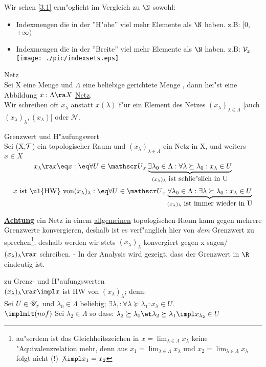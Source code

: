Wir sehen \ref{3.1} erm"oglicht im Vergleich zu $\N$ sowohl:
\begin{itemize}
\item Indexmengen die in der ''H"ohe'' viel mehr Elemente als $\N$ haben. z.B: [0,$+\infty)$
\item Indexmengen die in der ''Breite'' viel mehr Elemente als $\N$ haben. z.B: ${\mathcal V}_{x}$
\texttt{[image: ./pic/indexsets.eps]}
\end{itemize}
\begin{definition}\label{3.4}Netz\\
Sei X eine Menge und $\Lambda$ eine beliebige gerichtete Menge , dann hei"st eine Abbildung $x:\Lambda\ra X$ \ul{Netz}.\\
Wir schreiben oft $x_\lambda$ anstatt $x(\lambda )$ f"ur ein Element des Netzes $(x_\lambda )_{\lambda\in\Lambda} $ [auch $(x_\lambda )_\lambda ,(x_\lambda )]$ oder ${\mathcal N}$.
\end{definition}
\begin{definition}\label{3.5}Grenzwert und H"aufungswert\\
Sei (X,$\mathcal T$) ein topologischer Raum und $(x_\lambda )_{\lambda\in\Lambda}$ ein Netz in X, und weiters $x\in X$
$$x_\lambda\ra x \eq x :\eq\forall U\in\umg{U}{x}\underbrace{\exists\lambda_0\in\Lambda:\forall\lambda\succeq\lambda_0:x_\lambda\in U}_{(x_\lambda )_\lambda\mbox{ ist schlie"slich in U}}$$
$$x\mbox{ ist \ul{HW} von} (x_\lambda )_\lambda :\eq \forall U\in\umg{U}{x}\underbrace{\forall\lambda_0\in\Lambda :\exists \lambda\succeq\lambda_0:x_\lambda\in U}_{(x_\lambda )_\lambda\mbox{ ist immer wieder in U}}$$
\end{definition} 
{\bf\ul{Achtung}} ein Netz in einem \ul{allgemeinen} topologischen Raum kann gegen mehrere Grenzwerte konvergieren, deshalb ist es verf"anglich hier von {\it dem} Grenzwert zu sprechen\footnote{au"serdem ist das Gleichheitszeichen in $x=\lim_{\lambda\in\Lambda}x_\lambda$ keine "Aquivalenzrelation mehr, denn aus $x_1=\lim_{\lambda\in\Lambda}x_\lambda$ und $x_2=\lim_{\lambda\in\Lambda}x_\lambda$ folgt nicht (!) $\not\impl x_1=x_2$}; deshalb werden wir stets $(x_\lambda )_\lambda$ konvergiert gegen x sagen/ $(x_\lambda )_\lambda\ra x$ schreiben. - In der Analysis wird gezeigt, dass der Grenzwert in $\R$ eindeutig ist.

\begin{beob}\label{3.6}zu Grenz- und H"aufungswerten\\
$(x_\lambda )_\lambda\ra x\impl x$ ist HW von $(x_\lambda )_\lambda$; denn:\\
Sei $U\in{\mathscr U}_{x}$ und $\lambda_0\in\Lambda$ beliebig; $\exists\lambda_1: \forall\lambda\succeq\lambda_1: x_\lambda\in U$.\\
$\implmit(nof)$ Sei $\lambda_2\in\Lambda $ so dass: $\lambda_2\succeq\lambda_0 \et \lambda_2\succeq\lambda_1\impl x_{\lambda_2}\in U$
\end{beob}

